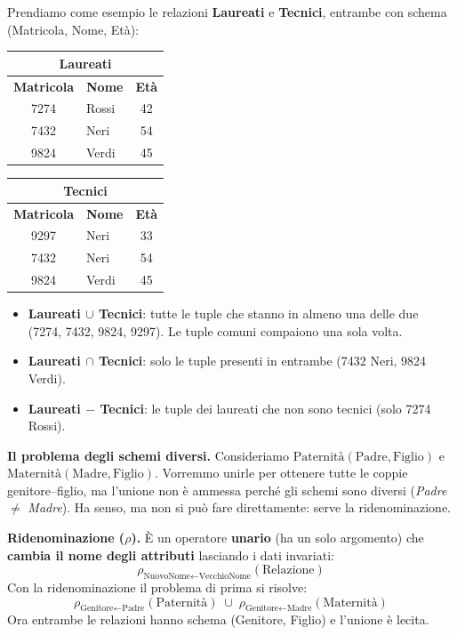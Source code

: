 \documentclass[12pt]{extarticle}
\begin{document}
\medskip
\noindent Prendiamo come esempio le relazioni \textbf{Laureati} e \textbf{Tecnici}, entrambe con schema (Matricola, Nome, Età):
\begin{center}
\small
\begin{tabular}{clc}
    \toprule
    \multicolumn{3}{c}{\textbf{Laureati}} \\
    \midrule
    \textbf{Matricola} & \textbf{Nome} & \textbf{Età} \\
    \midrule
    7274 & Rossi & 42 \\
    7432 & Neri & 54 \\
    9824 & Verdi & 45 \\
    \bottomrule
\end{tabular}
\qquad
\begin{tabular}{clc}
    \toprule
    \multicolumn{3}{c}{\textbf{Tecnici}} \\
    \midrule
    \textbf{Matricola} & \textbf{Nome} & \textbf{Età} \\
    \midrule
    9297 & Neri & 33 \\
    7432 & Neri & 54 \\
    9824 & Verdi & 45 \\
    \bottomrule
\end{tabular}
\end{center}
\begin{itemize}
    \item \textbf{Laureati $\cup$ Tecnici}: tutte le tuple che stanno in almeno una delle due (7274, 7432, 9824, 9297). Le tuple comuni compaiono una sola volta.
    \item \textbf{Laureati $\cap$ Tecnici}: solo le tuple presenti in entrambe (7432 Neri, 9824 Verdi).
    \item \textbf{Laureati $-$ Tecnici}: le tuple dei laureati che non sono tecnici (solo 7274 Rossi).
\end{itemize}

\medskip
\noindent \textbf{Il problema degli schemi diversi.} Consideriamo $\text{Paternità}(\text{Padre}, \text{Figlio})$ e $\text{Maternità}(\text{Madre}, \text{Figlio})$. Vorremmo unirle per ottenere tutte le coppie genitore--figlio, ma l'unione non è ammessa perché gli schemi sono diversi (\textit{Padre} $\neq$ \textit{Madre}). Ha senso, ma non si può fare direttamente: serve la ridenominazione.

\medskip
\noindent \textbf{Ridenominazione ($\rho$).} È un operatore \textbf{unario} (ha un solo argomento) che \textbf{cambia il nome degli attributi} lasciando i dati invariati:
\[
\rho_{\text{NuovoNome} \leftarrow \text{VecchioNome}}(\text{Relazione})
\]
Con la ridenominazione il problema di prima si risolve:
\[
\rho_{\text{Genitore} \leftarrow \text{Padre}}(\text{Paternità}) \;\cup\; \rho_{\text{Genitore} \leftarrow \text{Madre}}(\text{Maternità})
\]
Ora entrambe le relazioni hanno schema (Genitore, Figlio) e l'unione è lecita.
\end{document}
